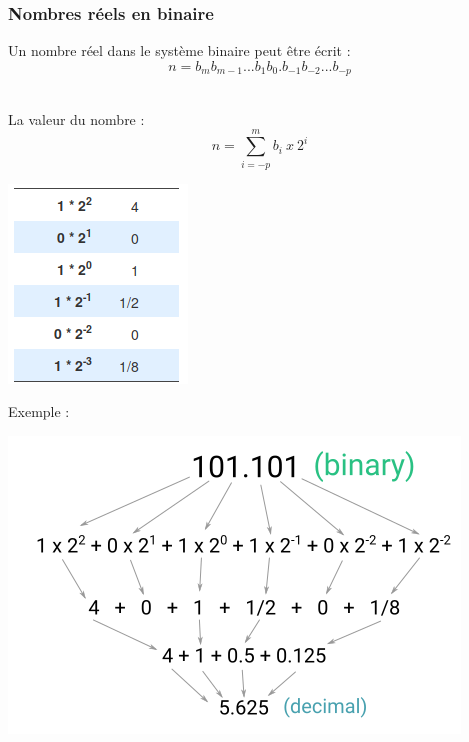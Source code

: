\documentclass{beamer}
\begin{document}
\begin{frame}
\frametitle{Nombres réels en binaire}

\begin{itemize}
\item Un nombre réel dans le système binaire peut être écrit :\\
  $$n = b_mb_{m-1}...b_1b_0.b_{-1}b_{-2}...b_{-p}$$\\

\begin{minipage}[b]{0.6\linewidth}
	\item La valeur du nombre :
  		$$n=\sum_{i=-p}^{m} b_i~x~2^i $$
\end{minipage} 
\begin{minipage}[b]{0.38\linewidth} 
	\centering
	\includegraphics[trim = 0cm 0cm 0cm 0cm, clip,scale=0.25]{figs/negativePower.png} 
\end{minipage}

\item  Exemple : 
\begin{minipage}[b]{0.98\linewidth} 
	\centering
	\includegraphics[trim = 0cm 0cm 0cm 0cm, clip,scale=0.25]{figs/floatingValFormation.png} 
\end{minipage}
\end{itemize}
\end{frame}
\end{document}
